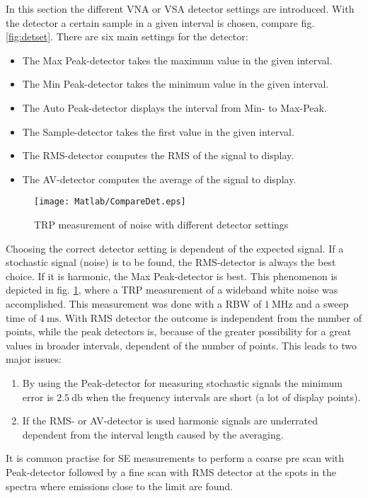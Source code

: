 In this section the different \ac{VNA} or \ac{VSA} detector settings are introduced. With the detector a certain sample in a given interval is chosen, compare fig. \ref{fig:detset}. There are six main settings for the detector: \cite{funsspec}
\begin{itemize}
\item The \textcolor[RGB]{237,28,36}{Max Peak-detector} takes the maximum value in the given interval.
\item The \textcolor[RGB]{0,166,88}{Min Peak-detector} takes the minimum value in the given interval.
\item The \textcolor[RGB]{0,94,138}{Auto Peak-detector} displays the interval from Min- to Max-Peak.
\item The \textcolor[RGB]{0,173,239}{Sample-detector} takes the first value in the given interval.
\item The \textcolor[RGB]{246,135,18}{RMS-detector} computes the \ac{RMS} of the signal to display.
\item The \textcolor[RGB]{114,100,184}{AV-detector} computes the average of the signal to display.
\end{itemize}

\begin{figure}
\centering
\texttt{[image: Matlab/CompareDet.eps]}
\caption{TRP measurement of noise with different detector settings}
\label{fig:trpmeasnoise}
\end{figure}

Choosing the correct detector setting is dependent of the expected signal. If a stochastic signal (noise) is to be found, the \ac{RMS}-detector is always the best choice. If it is harmonic, the Max Peak-detector is best. This phenomenon is depicted in fig. \ref{fig:trpmeasnoise}, where a \ac{TRP} measurement of a wideband white noise was accomplished. This measurement was done with a \ac{RBW} of $\SI{1}{\mega\hertz}$ and a sweep time of $\SI{4}{\milli\second}$. With \ac{RMS} detector the outcome is independent from the number of points, while the peak detectors is, because of the greater possibility for a great values in broader intervals, dependent of the number of points. This leads to two major issues:

\begin{enumerate}
\item By using the Peak-detector for measuring stochastic signals the minimum error is $\SI{2.5}{\decibel}$ when the frequency intervals are short (a lot of display points).
\item If the \ac{RMS}- or AV-detector is used harmonic signals are underrated dependent from the interval length caused by the averaging.
\end{enumerate} 

It is common practise for \ac{SE} measurements to perform a coarse pre scan with Peak-detector followed by a fine scan with \ac{RMS} detector at the spots in the spectra where emissions close to the limit are found.


